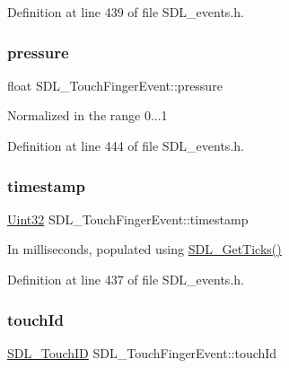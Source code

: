Definition at line 439 of file S\+D\+L\+\_\+events.\+h.

\mbox{\label{struct_s_d_l___touch_finger_event_ab4fca822d0807b5748dbae8d3cc56524}} 
\subsubsection{\texorpdfstring{pressure}{pressure}}
{\footnotesize\ttfamily float S\+D\+L\+\_\+\+Touch\+Finger\+Event\+::pressure}

Normalized in the range 0...1 

Definition at line 444 of file S\+D\+L\+\_\+events.\+h.

\mbox{\label{struct_s_d_l___touch_finger_event_abde2ab5cb013bbd21e37a65e2f8fa666}} 
\subsubsection{\texorpdfstring{timestamp}{timestamp}}
{\footnotesize\ttfamily \mbox{\hyperlink{_s_d_l__stdinc_8h_add440eff171ea5f55cb00c4a9ab8672d}{Uint32}} S\+D\+L\+\_\+\+Touch\+Finger\+Event\+::timestamp}

In milliseconds, populated using \mbox{\hyperlink{_s_d_l__timer_8h_a0b9bc71d6287e0ffafdc3419760fe2b3}{S\+D\+L\+\_\+\+Get\+Ticks()}} 

Definition at line 437 of file S\+D\+L\+\_\+events.\+h.

\mbox{\label{struct_s_d_l___touch_finger_event_ad7a6f39ec9af1bf47b160d18314edd70}} 
\subsubsection{\texorpdfstring{touchId}{touchId}}
{\footnotesize\ttfamily \mbox{\hyperlink{_s_d_l__touch_8h_a10f5f86abe4ea8308a8706bd5d3b337a}{S\+D\+L\+\_\+\+Touch\+ID}} S\+D\+L\+\_\+\+Touch\+Finger\+Event\+::touch\+Id}

